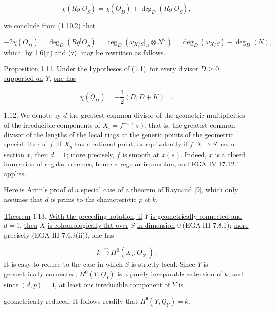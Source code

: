 \begin{equation*}
\chi(Rg^{!}\underline{O}_S)
=\chi(\underline{O}_D)+\deg_D(Rg^{!}\underline{O}_S),
\end{equation*}


we conclude from (1.10.2) that

\begin{equation*}
-2\chi(\underline{O}_D)
=\deg_D(Rg^{!}\underline{O}_S)
=\deg_D(\omega_{X/S}|_D\otimes N^{\vee})
=\deg_D(\omega_{X/S})-\deg_D(N),
\end{equation*}
which, by 1.6(ii) and (v), may be rewritten as follows.

\underline{Proposition} 1.11. \underline{Under the hypotheses of} (1.1),
\underline{for every divisor} $D\geq0$ \underline{supported on} $Y$,
\underline{one has}

\begin{equation*}
\chi(\underline{O}_D)=-\frac12(D,D+K) \quad .
\end{equation*}

1.12. We denote by $d$ the greatest common divisor of the geometric
multiplicities of the irreducible components of $X_s=f^{-1}(s)$; that is, the
greatest common divisor of the lengths of the local rings at the generic points
of the geometric special fibre of $f$.  If $X_\eta$ has a rational point, or
equivalently if $f:X\longrightarrow S$ has a section $x$, then $d=1$; more
precisely, $f$ is smooth at $x(s)$.  Indeed, $x$ is a closed immersion of regular
schemes, hence a regular immersion, and EGA IV 17.12.1 applies.

Here is Artin's proof of a special case of a theorem of Raynaud [9], which only
assumes that $d$ is prime to the characteristic $p$ of $k$.

\underline{Theorem} 1.13. \underline{With the preceding notation, if} $Y$
\underline{is geometrically connected and} $d=1$, \underline{then} $X$
\underline{is cohomologically flat over} $S$ \underline{in dimension} $0$
(EGA III 7.8.1); \underline{more precisely} (EGA III 7.6.9(ii)),
\underline{one has}

\begin{equation*}
k\xrightarrow{\;\sim\;}H^0(X_s,\underline{O}_{X_s}).
\end{equation*}
It is easy to reduce to the case in which $S$ is strictly local.  Since $Y$ is
geometrically connected, $H^0(Y,\underline{O}_Y)$ is a purely inseparable
extension of $k$; and since $(d,p)=1$, at least one irreducible component of $Y$
is


geometrically reduced.  It follows readily that
$H^0(Y,\underline{O}_Y)=k$.

